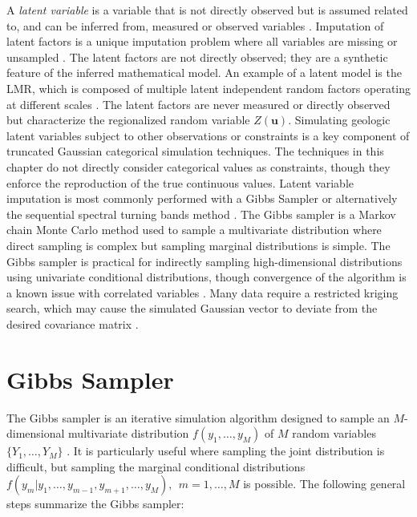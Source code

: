 A \textit{latent variable} is a variable that is not directly observed but is assumed related to, and can be inferred from, measured or observed variables \citep{everitt2010cambridge}. Imputation of latent factors is a unique imputation problem where all variables are missing or unsampled \citep{little2019statistical}. The latent factors are not directly observed; they are a synthetic feature of the inferred mathematical model. An example of a latent model is the \gls{LMR}, which is composed of multiple latent independent random factors operating at different scales \citep{goovaerts1992factorial}. The latent factors are never measured or directly observed but characterize the regionalized random variable $Z(\mathbf{u})$. Simulating geologic latent variables subject to other observations or constraints is a key component of truncated Gaussian categorical simulation techniques. The techniques in this chapter do not directly consider categorical values as constraints, though they enforce the reproduction of the true continuous values. Latent variable imputation is most commonly performed with a Gibbs Sampler \citep{emery2014simulating,silva2017multiple,arroyo2020iterative,madani2021enhanced} or alternatively the sequential spectral turning bands method \citep{lauzon2020calibration,lauzon2020sequential,lauzon2023joint}. The Gibbs sampler is a Markov chain Monte Carlo method used to sample a multivariate distribution where direct sampling is complex but sampling marginal distributions is simple. The Gibbs sampler is practical for indirectly sampling high-dimensional distributions using univariate conditional distributions, though convergence of the algorithm is a known issue with correlated variables \citep{silva2018enhanced}. Many data require a restricted kriging search, which may cause the simulated Gaussian vector to deviate from the desired covariance matrix \citep{emery2014simulating}.


\FloatBarrier
\section{Gibbs Sampler}
\label{sec:gibbs}

The Gibbs sampler \citep{geman1984stochastic} is an iterative simulation algorithm designed to sample an $M$-dimensional multivariate distribution $f(y_{1}, \dots, y_{M})$ of $M$ random variables $\{Y_{1}, \dots, Y_{M}\}$ \citep{little2019statistical}. It is particularly useful where sampling the joint distribution is difficult, but sampling the marginal conditional distributions $f(y_{m}|y_{1},\dots,y_{m-1},y_{m+1},\dots,y_{M}), \ \ m=1,\dots,M$ is possible. The following general steps summarize the Gibbs sampler:

